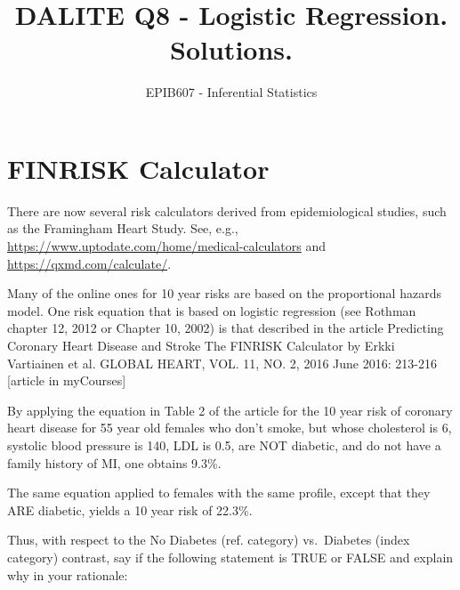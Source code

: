 \documentclass[letterpaper,9pt,twoside,printwatermark=false]{pinp}
\title{DALITE Q8 - Logistic Regression. Solutions.}
\author[a]{EPIB607 - Inferential Statistics}
\affil[a]{Fall 2018, McGill University}
\begin{document}
\verticaladjustment{-2pt}

\maketitle
\thispagestyle{firststyle}



\section*{FINRISK Calculator}\label{finrisk-calculator}

There are now several risk calculators derived from epidemiological
studies, such as the Framingham Heart Study. See, e.g.,
\url{https://www.uptodate.com/home/medical-calculators} and
\url{https://qxmd.com/calculate/}.

Many of the online ones for 10 year risks are based on the proportional
hazards model. One risk equation that is based on logistic regression
(see Rothman chapter 12, 2012 or Chapter 10, 2002) is that described in
the article Predicting Coronary Heart Disease and Stroke The FINRISK
Calculator by Erkki Vartiainen et al. GLOBAL HEART, VOL. 11, NO. 2, 2016
June 2016: 213-216 {[}article in myCourses{]}

By applying the equation in Table 2 of the article for the 10 year risk
of coronary heart disease for 55 year old females who don't smoke, but
whose cholesterol is 6, systolic blood pressure is 140, LDL is 0.5, are
NOT diabetic, and do not have a family history of MI, one obtains 9.3\%.

The same equation applied to females with the same profile, except that
they ARE diabetic, yields a 10 year risk of 22.3\%.

Thus, with respect to the No Diabetes (ref. category) vs.~Diabetes
(index category) contrast, say if the following statement is TRUE or
FALSE and explain why in your rationale:
\end{document}
